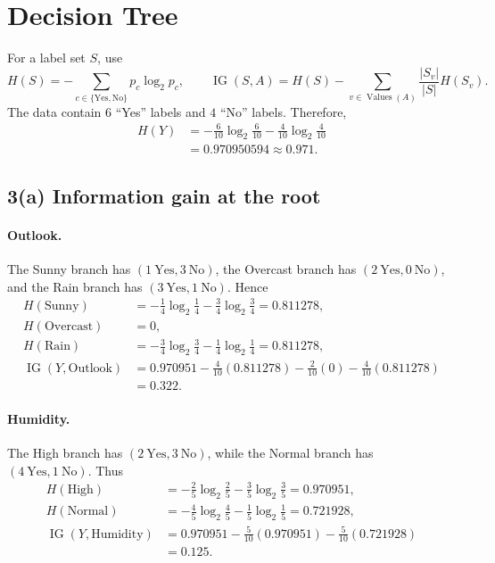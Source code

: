 \documentclass[11pt]{article}
\newcommand{\entropy}{H}
\newcommand{\IG}{\operatorname{IG}}
\begin{document}
\section{Decision Tree}

For a label set $S$, use
\[
\entropy(S)=-\sum_{c\in\{\mathrm{Yes},\mathrm{No}\}}
 p_c\log_2 p_c,
\qquad
\IG(S,A)=\entropy(S)-\sum_{v\in\operatorname{Values}(A)}
 \frac{|S_v|}{|S|}\entropy(S_v).
\]
The data contain $6$ ``Yes'' labels and $4$ ``No'' labels.  Therefore,
\begin{align*}
\entropy(Y)
&=-\frac{6}{10}\log_2\frac{6}{10}-\frac{4}{10}\log_2\frac{4}{10}\\
&=0.970950594\approx 0.971.
\end{align*}

\subsection*{3(a) Information gain at the root}

\paragraph{Outlook.}
The Sunny branch has $(1\ \mathrm{Yes},3\ \mathrm{No})$, the Overcast branch
has $(2\ \mathrm{Yes},0\ \mathrm{No})$, and the Rain branch has
$(3\ \mathrm{Yes},1\ \mathrm{No})$.  Hence
\begin{align*}
\entropy(\mathrm{Sunny})&=-\tfrac14\log_2\tfrac14-\tfrac34\log_2\tfrac34
=0.811278,\\
\entropy(\mathrm{Overcast})&=0,\\
\entropy(\mathrm{Rain})&=-\tfrac34\log_2\tfrac34-\tfrac14\log_2\tfrac14
=0.811278,\\
\IG(Y,\mathrm{Outlook})
&=0.970951-\tfrac4{10}(0.811278)-\tfrac2{10}(0)-\tfrac4{10}(0.811278)\\
&=\boxed{0.322}.
\end{align*}

\paragraph{Humidity.}
The High branch has $(2\ \mathrm{Yes},3\ \mathrm{No})$, while the Normal branch
has $(4\ \mathrm{Yes},1\ \mathrm{No})$.  Thus
\begin{align*}
\entropy(\mathrm{High})&=-\tfrac25\log_2\tfrac25-\tfrac35\log_2\tfrac35
=0.970951,\\
\entropy(\mathrm{Normal})&=-\tfrac45\log_2\tfrac45-\tfrac15\log_2\tfrac15
=0.721928,\\
\IG(Y,\mathrm{Humidity})
&=0.970951-\tfrac5{10}(0.970951)-\tfrac5{10}(0.721928)\\
&=\boxed{0.125}.
\end{align*}
\end{document}
